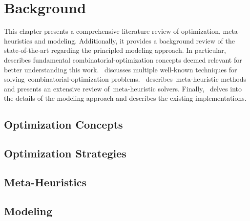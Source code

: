 \chapter{Background}
\label{ch:background}


This chapter presents a comprehensive literature review of optimization,
meta-heuristics and modeling. Additionally, it provides a background review of
the state-of-the-art regarding the principled modeling approach. In
particular,~ describes fundamental
\acrshort{combinatorial-optimization} concepts deemed relevant for better
understanding this work.~ discusses multiple well-known techniques for
solving~\acrshort{combinatorial-optimization}
problems.~ describes~\acrshort{meta-heuristic} methods
and presents an extensive review of~\acrshort{meta-heuristic} solvers.
Finally,~ delves into the details of the modeling approach
and describes the existing implementations.

\section{Optimization Concepts}
\label{sec:optimization-concepts}


\section{Optimization Strategies}
\label{sec:optimization-strategies}


\section{Meta-Heuristics}
\label{sec:meta-heuristics}


\section{Modeling}
\label{sec:modelling}
